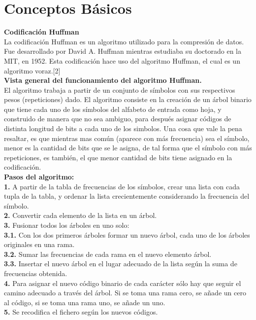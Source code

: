 \documentclass[12pt]{report}
\begin{document}
	\newpage
	
	\section{Conceptos Básicos}
	\textbf{Codificación Huffman}\\
		
	La codificación Huffman es un algoritmo utilizado para la compresión de datos. Fue desarrollado por David A. Huffman mientras estudiaba su doctorado en la MIT, en 1952. Esta codificación hace uso del algoritmo Huffman, el cual es un algoritmo voraz.[2]\\ 
	
	\textbf{Vista general del funcionamiento del algoritmo Huffman.}\\
	
	El algoritmo trabaja a partir de un conjunto de símbolos con sus respectivos pesos (repeticiones) dado. El algoritmo consiste en la creación de un árbol binario que tiene cada uno de los símbolos del alfabeto de entrada como hoja, y construido de manera que no sea ambiguo, para después asignar códigos de distinta longitud de bits a cada uno de los simbolos. Una cosa que vale la pena resaltar, es que mientras mas común (aparece con más frecuencia) sea el símbolo, menor es la cantidad de bits que se le asigna, de tal forma que el símbolo con más repeticiones, es también, el que menor cantidad de bits tiene asignado en la codificación.\\
	
	\textbf{Pasos del algoritmo:}\\
	\textbf{1.} A partir de la tabla de frecuencias de los símbolos, crear una lista con cada tupla de la tabla, y ordenar la lista crecientemente considerando la frecuencia del símbolo.\\
	\textbf{2.} Convertir cada elemento de la lista en un árbol.\\
	\textbf{3.} Fusionar todos los árboles en uno solo:\\
	\textbf{3.1.} Con los dos primeros árboles formar un nuevo árbol, cada uno de los árboles originales en una rama.\\
	\textbf{3.2.} Sumar las frecuencias de cada rama en el nuevo elemento árbol.\\
	\textbf{3.3.} Insertar el nuevo árbol en el lugar adecuado de la lista según la suma de frecuencias obtenida.\\
	\textbf{4.} Para asignar el nuevo código binario de cada carácter sólo hay que seguir el camino adecuado a través del árbol. Si se toma una rama cero, se añade un cero al código, si se toma una rama uno, se añade un uno.\\
	\textbf{5.} Se recodifica el fichero según los nuevos códigos.\\
	
\end{document}
